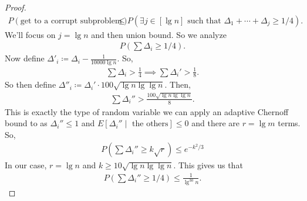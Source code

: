 \documentclass{report}
\begin{document}
\begin{proof}
\begin{align*}
        P(\text{get to a corrupt subproblem}) &\leq P(\text{$\exists j \in [\lg n]$ such that $\Delta_1 + \cdots + \Delta_j \geq 1/4$}).
    \end{align*}
    We'll focus on $j = \lg n$ and then union bound. So we analyze
    \begin{align*}
        P(\sum \Delta_i \geq 1/4).
    \end{align*}
    Now define $\Delta'_i \coloneq \Delta_i - \frac{1}{10000\lg n}$. So,
    \begin{align*}
        \sum \Delta_i > \frac 14 \implies \sum \Delta_i' > \frac 18.
    \end{align*}
    So then define $\Delta''_i \coloneq \Delta_i' \cdot 100\sqrt{\lg n \lg \lg n}$. Then,
    \begin{align*}
        \sum \Delta_i'' > \frac{100 \sqrt{\lg n\lg \lg n}}{8}.
    \end{align*}
    This is exactly the type of random variable we can apply an adaptive Chernoff bound to as $\Delta_i'' \leq 1$ and $E[\Delta_i'' \mid \text{ the others}] \leq 0$ and there are $r = \lg m$ terms. So,
    \begin{align*}
        P(\sum \Delta_i'' \geq k\sqrt r) \leq e^{-k^2/3}
    \end{align*}
    In our case, $r = \lg n$ and $k \geq 10 \sqrt{\lg n \lg \lg n}$. This gives us that 
    \begin{align*}
        P(\sum \Delta_i'' \geq 1/4) \leq \frac{1}{\lg^{30}n}.
    \end{align*}

\end{proof}
\end{document}
